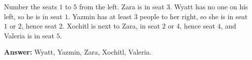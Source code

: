 Number the seats $1$ to $5$ from the left. Zara is in seat $3$. Wyatt has no one on his left, so he is in seat $1$. Yazmin has at least $3$ people to her right, so she is in seat $1$ or $2$, hence seat $2$. Xochitl is next to Zara, in seat $2$ or $4$, hence seat $4$, and Valeria is in seat $5$.

\textbf{Answer:} Wyatt, Yazmin, Zara, Xochitl, Valeria.

